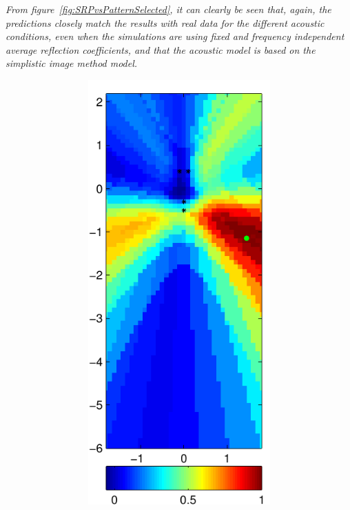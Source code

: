 \documentclass[spanish,openright]{book}
\begin{document}
\emph{From figure~\ref{fig:SRPvsPatternSelected}, it can clearly be seen that,
again, the predictions closely match the results with real data for the
different acoustic conditions, even when the simulations are using fixed
and frequency independent average reflection coefficients, and that the
acoustic model is based on the simplistic image method model.}

\begin{figure}
  \centering
  \begin{subfigure}[t]{0.47\textwidth}
    \begin{minipage}[t]{\textwidth}
      \begin{subfigure}[t]{0.3\textwidth}
        \includegraphics[width=\textwidth]{Pattern_Fo1500_pos01}

\end{subfigure}
\end{minipage}
\end{subfigure}
\end{figure}
\end{document}
